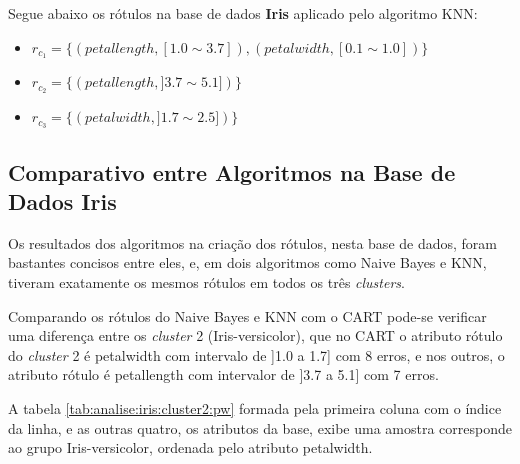 Segue abaixo os rótulos na base de dados \textbf{Iris} aplicado pelo algoritmo KNN:
\begin{itemize}[noitemsep]
 \item ${r_{c_1}=\{ (petallength, [ 1.0 \sim 3.7]), (petalwidth,[ 0.1 \sim 1.0 ] ) \} }$  
 \item ${r_{c_2}=\{ (petallength, ] 3.7 \sim 5.1]) \} }$
 \item ${r_{c_3}=\{ (petalwidth, ] 1.7 \sim 2.5 ]) \} }$
\end{itemize}

\subsection{Comparativo entre Algoritmos na Base de Dados Iris} \label{cap:resultados:ssec:compalgoritmos:iris}

Os resultados dos algoritmos na criação dos rótulos, nesta base de dados, foram bastantes concisos entre eles, e, em dois algoritmos como Naive Bayes e KNN, tiveram exatamente os mesmos rótulos em todos os três \textit{clusters}.

Comparando os rótulos do Naive Bayes e KNN com o CART pode-se verificar uma diferença entre os \textit{cluster} 2 (Iris-versicolor), que no CART o atributo rótulo do \textit{cluster} 2 é petalwidth com intervalo de ]1.0 a 1.7] com 8 erros, e nos outros, o atributo rótulo é petallength com intervalor de ]3.7 a 5.1] com 7 erros. 

A tabela \ref{tab:analise:iris:cluster2:pw} formada pela primeira coluna com o índice da linha, e as outras quatro, os atributos da base, exibe uma amostra corresponde ao grupo Iris-versicolor, ordenada pelo atributo petalwidth.

